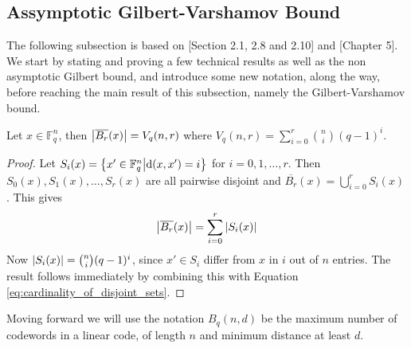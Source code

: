\subsection{Assymptotic Gilbert-Varshamov Bound}
The following subsection is based on \cite{huffman}[Section 2.1, 2.8 and 2.10] and \cite{notes_on_alg_geom_codes}[Chapter 5]. We start by stating and proving a few technical results as well as the non asymptotic Gilbert bound, and introduce some new notation, along the way, before reaching the main result of this subsection, namely the Gilbert-Varshamov bound.

\begin{lemma}\label{lem:number_of_elements_in_sphere}
  Let $x \in \mathbb{F}_q^n$, then $\left\lvert\overline{B_{r}}(x)\right\rvert = V_{q}(n, r)$ where $V_{q}(n, r) = \displaystyle\sum_{i=0}^r \binom{n}{i} (q - 1)^{i}$.
\end{lemma}
\begin{proof}
  Let $S_i(x) = \left\{x' \in \mathbb{F}_q^n \middle| \mathrm{d}(x, x') = i\right\}$ for $i = 0, 1, \ldots, r$. Then $S_0(x), S_1(x), \ldots, S_{r}(x)$ are all pairwise disjoint and $\overline{B_r}(x) = \bigcup_{i = 0}^r S_i(x)$. This gives
  \begin{equation}\label{eq:cardinality_of_disjoint_sets}
    \left\lvert\overline{B_r}(x)\right\rvert = \sum_{i = 0}^r \left\lvert S_i(x)\right\rvert
  \end{equation}
  Now $\left\lvert S_i(x)\right\rvert = \binom{n}{i}(q - 1)^i$, since $x' \in S_{i}$ differ from $x$ in $i$ out of $n$ entries. The result follows immediately by combining this with Equation \eqref{eq:cardinality_of_disjoint_sets}.
\end{proof}

Moving forward we will use the notation $B_{q}(n, d)$ be the maximum number of codewords in a linear code, of length $n$ and minimum distance at least $d$.

